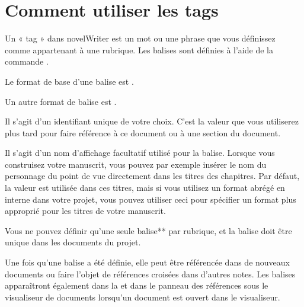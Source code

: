 \documentclass[a4paper,11pt,french]{sphinxmanual}
\begin{document}
\section{Comment utiliser les tags}
\label{\detokenize{project_references:how-to-use-tags}}\label{\detokenize{project_references:a-references-tags}}
\sphinxAtStartPar
Un « tag » dans novelWriter est un mot ou une phrase que vous définissez comme appartenant à une rubrique. Les balises sont définies à l’aide de la commande  {\hyperref[\detokenize{int_glossary:term-Keyword}]{}}.

\sphinxAtStartPar
Le format de base d’une balise est .

\sphinxAtStartPar
Un autre format de balise est .
\begin{description}
\sphinxAtStartPar
Il s’agit d’un identifiant unique de votre choix. C’est la valeur que vous utiliserez plus tard pour faire référence à ce document ou à une section du document.

\sphinxAtStartPar
Il s’agit d’un nom d’affichage facultatif utilisé pour la balise. Lorsque vous construisez votre manuscrit, vous pouvez par exemple insérer le nom du personnage du point de vue directement dans les titres des chapitres. Par défaut, la valeur  est utilisée dans ces titres, mais si vous utilisez un format abrégé en interne dans votre projet, vous pouvez utiliser ceci pour spécifier un format plus approprié pour les titres de votre manuscrit.

\end{description}

\sphinxAtStartPar
Vous ne pouvez définir qu’une seule balise** par rubrique, et la balise doit être unique dans  les documents du projet.

\sphinxAtStartPar
Une fois qu’une balise a été définie, elle peut être référencée dans de nouveaux documents ou faire l’objet de références croisées dans d’autres notes. Les balises apparaîtront également dans la  et dans le panneau des références sous le visualiseur de documents lorsqu’un document est ouvert dans le visualiseur.
\end{document}
